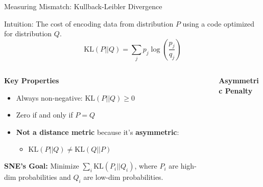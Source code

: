 \documentclass{beamer}
\begin{document}
\begin{frame}{Measuring Mismatch: Kullback-Leibler Divergence}
\vspace{-0.2cm}

\begin{center}
\colorbox{upcblue!10}{
\begin{minipage}{0.9\textwidth}
\centering
\small Intuition: The cost of encoding data from distribution $P$ using a code optimized for distribution $Q$.
$$ \text{KL}(P||Q) = \sum_{j} p_j \log\left(\frac{p_j}{q_j}\right) $$
\end{minipage}
}
\end{center}
\vspace{0.2cm}

\begin{columns}[T]
\begin{column}{0.48\textwidth}
\textbf{\color{upcblue}Key Properties}
\begin{itemize}
    \setlength\itemsep{0.3em}
    \item Always non-negative: $\text{KL}(P||Q) \ge 0$
    \item Zero if and only if $P=Q$
    \item \textbf{Not a distance metric} because it's \textbf{asymmetric}:
    \begin{itemize}
        \item[] $\text{KL}(P||Q) \neq \text{KL}(Q||P)$
    \end{itemize}
\end{itemize}

\vspace{0.1cm}
\colorbox{highlight!20}{
\begin{minipage}{0.9\linewidth}
\small
\textbf{SNE's Goal:} Minimize $\sum_i \text{KL}(P_i||Q_i)$, where $P_i$ are high-dim probabilities and $Q_i$ are low-dim probabilities.
\end{minipage}
}

\end{column}

\begin{column}{0.48\textwidth}
\textbf{\color{upcblue}Asymmetric Penalty}

\begin{center}
\end{center}
\end{column}
\end{columns}
\end{frame}
\end{document}
